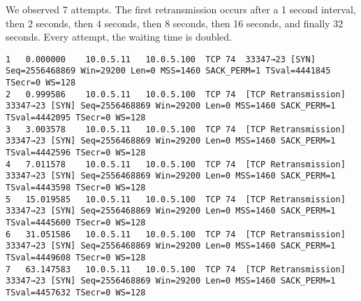 We observed 7 attempts. The first retransmission occurs after a 1 second interval, then 2 seconds, then 4 seconds, then 8 seconds, then 16 seconds, and finally 32 seconds. Every attempt, the waiting time is doubled.

\begin{lstlisting}
1	0.000000	10.0.5.11	10.0.5.100	TCP	74	33347→23 [SYN] Seq=2556468869 Win=29200 Len=0 MSS=1460 SACK_PERM=1 TSval=4441845 TSecr=0 WS=128
2	0.999586	10.0.5.11	10.0.5.100	TCP	74	[TCP Retransmission] 33347→23 [SYN] Seq=2556468869 Win=29200 Len=0 MSS=1460 SACK_PERM=1 TSval=4442095 TSecr=0 WS=128
3	3.003578	10.0.5.11	10.0.5.100	TCP	74	[TCP Retransmission] 33347→23 [SYN] Seq=2556468869 Win=29200 Len=0 MSS=1460 SACK_PERM=1 TSval=4442596 TSecr=0 WS=128
4	7.011578	10.0.5.11	10.0.5.100	TCP	74	[TCP Retransmission] 33347→23 [SYN] Seq=2556468869 Win=29200 Len=0 MSS=1460 SACK_PERM=1 TSval=4443598 TSecr=0 WS=128
5	15.019585	10.0.5.11	10.0.5.100	TCP	74	[TCP Retransmission] 33347→23 [SYN] Seq=2556468869 Win=29200 Len=0 MSS=1460 SACK_PERM=1 TSval=4445600 TSecr=0 WS=128
6	31.051586	10.0.5.11	10.0.5.100	TCP	74	[TCP Retransmission] 33347→23 [SYN] Seq=2556468869 Win=29200 Len=0 MSS=1460 SACK_PERM=1 TSval=4449608 TSecr=0 WS=128
7	63.147583	10.0.5.11	10.0.5.100	TCP	74	[TCP Retransmission] 33347→23 [SYN] Seq=2556468869 Win=29200 Len=0 MSS=1460 SACK_PERM=1 TSval=4457632 TSecr=0 WS=128
\end{lstlisting}